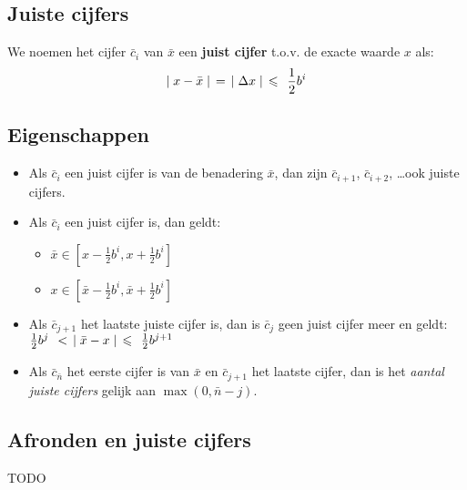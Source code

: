\documentclass[11pt]{report}
\def \eq {\hspace{1.5mm}=\hspace{1.5mm}}
\def \lesseq {\hspace{1.5mm}\leqslant\hspace{1.5mm}}
\def \less {\hspace{1.5mm}<\hspace{1.5mm}}
\begin{document}
	 \subsection{Juiste cijfers}
	 We noemen het cijfer $\bar c_i$ van $\bar x$ een \textbf{juist cijfer} t.o.v. de exacte waarde $x$ als:
	 $$\mid x - \bar x \mid \eq \mid \Delta x \mid \lesseq \frac{1}{2}b^i$$
	 \subsection*{Eigenschappen}
	 	\begin{itemize}
	 		\item Als $\bar c_i$ een juist cijfer is van de benadering $\bar x$, dan zijn $\bar c_{i+1}$, $\bar c_{i+2}$, \dots ook juiste cijfers.
	 		\item Als $\bar c_i$ een juist cijfer is, dan geldt:
	 		\begin{itemize}
	 			\item $\bar x \in [x - \frac{1}{2}b^i, x + \frac{1}{2}b^i]$
	 			\item $x \in [\bar x - \frac{1}{2}b^i, \bar x + \frac{1}{2}b^i]$
	 		\end{itemize}
	 		\item Als $\bar c_{j+1}$ het laatste juiste cijfer is, dan is $\bar c_j$ geen juist cijfer meer en geldt: $\frac{1}{2} b^j \less \mid \bar x - x \mid \lesseq \frac{1}{2} b^{j+1}$
	 		\item Als $\bar c_{\bar n}$ het eerste cijfer is van $\bar x$ en $\bar c_{j+1}$ het laatste cijfer, dan is het \textit{aantal juiste cijfers} gelijk aan $\max(0, \bar n - j)$.
	 	\end{itemize}
	 \subsection*{Afronden en juiste cijfers}
	 TODO
\end{document}
